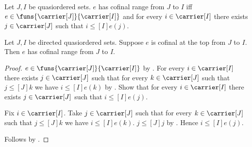 \begin{definition}\label{cofinal_range_between_quasiorders}
    Let $J,I$ be quasiordered sets.
    $e$ has cofinal range from $J$ to $I$ iff
        $e\in\funs{\carrier[J]}{\carrier[I]}$ and
        for every $i\in\carrier[I]$ there exists $j\in\carrier[J]$
        such that $i\mathrel{\leq[I]}e(j)$.
\end{definition}

\begin{theorem}\label{at_top_cofinal_implies_cofinal_range}
    Let $J,I$ be directed quasiordered sets.
    Suppose $e$ is cofinal at the top from $J$ to $I$.
    Then $e$ has cofinal range from $J$ to $I$.
\end{theorem}
\begin{proof}
    $e\in\funs{\carrier[J]}{\carrier[I]}$ by
        .
    For every $i\in\carrier[I]$ there exists $j\in\carrier[J]$
        such that for every $k\in\carrier[J]$ such that
        $j\mathrel{\leq[J]}k$ we have
        $i\mathrel{\leq[I]}e(k)$ by
        .
    Show that for every $i\in\carrier[I]$ there exists
        $j\in\carrier[J]$ such that $i\mathrel{\leq[I]}e(j)$.
    \begin{subproof}
        Fix $i\in\carrier[I]$.
        Take $j\in\carrier[J]$ such that for every
            $k\in\carrier[J]$ such that $j\mathrel{\leq[J]}k$
            we have $i\mathrel{\leq[I]}e(k)$.
        $j\mathrel{\leq[J]}j$ by .
        Hence $i\mathrel{\leq[I]}e(j)$.
    \end{subproof}
    Follows by .
\end{proof}

